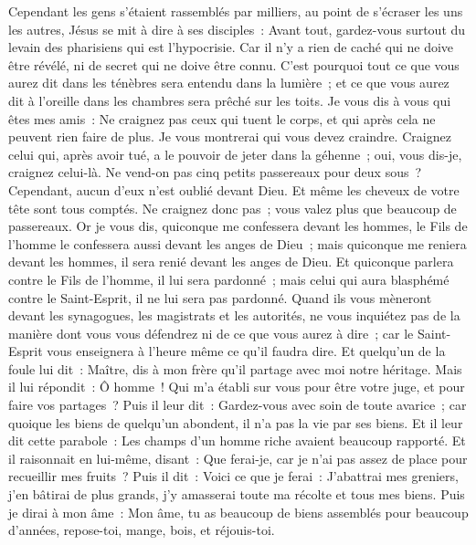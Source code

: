 \begin{multicols}{2}
\VerseOne{}Cependant les gens s'étaient rassemblés par milliers, au point de s'écraser les uns les autres, Jésus se mit à dire à ses disciples~: Avant tout, gardez-vous surtout du levain des pharisiens qui est l'hypocrisie.
Car il n'y a rien de caché qui ne doive être révélé, ni de secret qui ne doive être connu.
C'est pourquoi tout ce que vous aurez dit dans les ténèbres sera entendu dans la lumière~; et ce que vous aurez dit à l'oreille dans les chambres sera prêché sur les toits.
Je vous dis à vous qui êtes mes amis~: Ne craignez pas ceux qui tuent le corps, et qui après cela ne peuvent rien faire de plus.
Je vous montrerai qui vous devez craindre. Craignez celui qui, après avoir tué, a le pouvoir de jeter dans la géhenne~; oui, vous dis-je, craignez celui-là.
Ne vend-on pas cinq petits passereaux pour deux sous~? Cependant, aucun d'eux n'est oublié devant Dieu.
Et même les cheveux de votre tête sont tous comptés. Ne craignez donc pas~; vous valez plus que beaucoup de passereaux.
Or je vous dis, quiconque me confessera devant les hommes, le Fils de l'homme le confessera aussi devant les anges de Dieu~;
mais quiconque me reniera devant les hommes, il sera renié devant les anges de Dieu.
Et quiconque parlera contre le Fils de l'homme, il lui sera pardonné~; mais celui qui aura blasphémé contre le Saint-Esprit, il ne lui sera pas pardonné.
Quand ils vous mèneront devant les synagogues, les magistrats et les autorités, ne vous inquiétez pas de la manière dont vous vous défendrez ni de ce que vous aurez à dire~;
car le Saint-Esprit vous enseignera à l'heure même ce qu'il faudra dire.
Et quelqu'un de la foule lui dit~: Maître, dis à mon frère qu'il partage avec moi notre héritage.
Mais il lui répondit~: Ô homme~! Qui m'a établi sur vous pour être votre juge, et pour faire vos partages~?
Puis il leur dit~: Gardez-vous avec soin de toute avarice~; car quoique les biens de quelqu'un abondent, il n'a pas la vie par ses biens.
Et il leur dit cette parabole~: Les champs d'un homme riche avaient beaucoup rapporté.
Et il raisonnait en lui-même, disant~: Que ferai-je, car je n'ai pas assez de place pour recueillir mes fruits~?
Puis il dit~: Voici ce que je ferai~: J'abattrai mes greniers, j'en bâtirai de plus grands, j'y amasserai toute ma récolte et tous mes biens.
Puis je dirai à mon âme~: Mon âme, tu as beaucoup de biens assemblés pour beaucoup d'années, repose-toi, mange, bois, et réjouis-toi.

\end{multicols}
